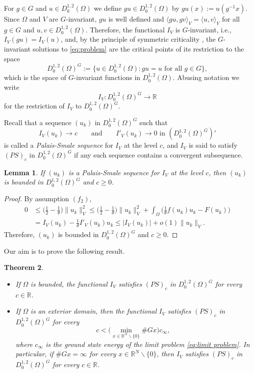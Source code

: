 \documentclass[10pt,letterpaper]{article}
\newtheorem{theorem}{Theorem}[section]
\newtheorem{lemma}[theorem]{Lemma}
\numberwithin{equation}{section}
\def\r{\mathbb{R}}
\def\rn{\mathbb{R}^N}
\def\io{\int_{\Omega}}
\def\o{\Omega}
\begin{document}
For $g\in G$ and $u\in D^{1,2}_0(\o)$ we define $gu\in D^{1,2}_0(\o)$ by $gu(x):=u(g^{-1}x)$. Since $\o$ and $V$ are $G$-invariant, $gu$ is well defined and $\langle gu,gv\rangle_V=\langle u,v\rangle_V$ for all $g\in G$ and $u,v\in D^{1,2}_0(\o)$. Therefore, the functional $I_V$ is $G$-invariant, i.e., $I_V(gu)=I_V(u)$, and, by the principle of symmetric criticality \cite[Theorem 1.28]{w}, the $G$-invariant solutions to \eqref{eq:problem} are the critical points of its restriction to the space
$$D^{1,2}_0(\o)^G:=\{u\in D^{1,2}_0(\o):gu=u\text{ for all }g\in G\},$$
which is the space of $G$-invariant functions in $D^{1,2}_0(\o)$. Abusing notation we write
$$I_V:D^{1,2}_0(\o)^G\to\r$$
for the restriction of $I_V$ to $D^{1,2}_0(\o)^G$.

Recall that a sequence $(u_k)$ in $D^{1,2}_0(\o)^G$ such that
$$I_V(u_k)\to c\qquad\text{and}\qquad I'_V(u_k)\to 0\text{ \ in \ }(D^{1,2}_0(\o)^G)'$$
is called a \emph{Palais-Smale sequence} for $I_V$ at the level $c$, and $I_V$ is said to satisfy $(PS)_c$ in $D^{1,2}_0(\o)^G$ if any such sequence contains a convergent subsequence.

\begin{lemma}\label{lem:ps bounded}
If $(u_k)$ is a Palais-Smale sequence for $I_V$ at the level $c$, then $(u_k)$ is bounded in $D^{1,2}_0(\o)^G$ and $c\geq 0$.
\end{lemma}

\begin{proof}
By assumption $(f_2)$,
\begin{align}\label{eq:bounded}
0&\leq\Big(\frac{1}{2}-\frac{1}{\theta}\Big)\|u_k\|^2_V\leq \Big(\frac{1}{2}-\frac{1}{\theta}\Big)\|u_k\|^2_V+\io \Big(\frac{1}{\theta}f(u_k)u_k -F(u_k)\Big) \nonumber \\
&=I_V(u_k)-\frac{1}{\theta}I'_V(u_k)u_k\leq |I_V(u_k)|+o(1)\|u_k\|_V.
\end{align}
Therefore, $(u_k)$ is bounded in $D^{1,2}_0(\o)^G$ and $c\geq 0$.
\end{proof}

Our aim is to prove the following result.

\begin{theorem} \label{thm:compactness}
\begin{itemize}
\item[$(a)$] If $\o$ is bounded, the functional $I_V$ satisfies $(PS)_c$ in $D^{1,2}_0(\o)^G$ for every $c\in\r$.
\item[$(b)$] If $\o$ is an exterior domain, then the functional $I_V$ satisfies $(PS)_c$ in $D^{1,2}_0(\o)^G$ for every 
$$c<\Big(\min_{x\in\rn\smallsetminus\{0\}}\#Gx\Big)c_\infty,$$
where $c_\infty$ is the ground state energy of the limit problem \eqref{eq:limit problem}. 
In particular, if $\#Gx=\infty$ for every $x\in\rn\smallsetminus\{0\}$, then $I_V$ satisfies $(PS)_c$ in $D^{1,2}_0(\o)^G$ for every $c\in\r$.
\end{itemize}
\end{theorem}
\end{document}
